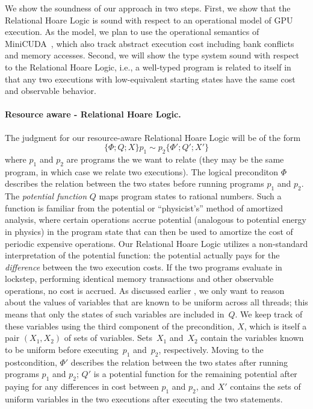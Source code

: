 We show the soundness of our approach in two steps.
%
First, we show that the Relational Hoare Logic is sound with respect to an operational model of GPU execution.
%
As the model, we plan to use the operational semantics of MiniCUDA~\cite{MullerHo21}, which also track abstract execution cost including bank conflicts and memory accesses.
%
Second, we will show the type system sound with respect to the Relational Hoare Logic, i.e., a well-typed program is related to itself in that any two executions with low-equivalent starting states have the same cost and observable behavior.



\paragraph{Resource aware - Relational Hoare Logic.}
The judgment for our resource-aware Relational Hoare Logic will be of the form 
%
\[\{\Phi; Q; X\} p_1 \sim p_2 \{\Phi'; Q'; X'\}\]
%
where $p_1$ and $p_2$ are programs the we want to relate (they may be the same program, in which case we relate two executions).%
The logical preconditon $\Phi$  describes the relation between the two states before running programs $p_1$ and $p_2$. 
%
The {\em potential function} $Q$ maps program states to rational numbers.
%
Such a function is familiar from the potential or ``physicist's'' method of amortized analysis, where certain operations accrue potential (analogous to potential energy in physics) in the program state that can then be used to amortize the cost of periodic expensive operations.
%
Our Relational Hoare Logic utilizes a non-standard interpretation of the potential function: the potential actually pays for the {\em difference} between the two execution costs.
%
If the two programs evaluate in lockstep, performing identical memory transactions and other observable operations, no cost is accrued.
%
As discussed earlier , we only want to reason about the values of variables that are known to be uniform across all threads; this means that only the states of such variables are included in~$Q$.
%
We keep track of these variables using the third component of the precondition, $X$, which is itself a pair $(X_1, X_2)$ of sets of variables.
%
Sets~$X_1$ and~$X_2$ contain the variables known to be uniform before executing~$p_1$ and~$p_2$, respectively.
%
Moving to the postcondition, $\Phi'$ describes the relation between the two states after running programs $p_1$ and $p_2$; $Q'$ is a potential function for the remaining potential after paying for any differences in cost between $p_1$ and $p_2$, and $X'$ contains the sets of uniform variables in the two executions after executing the two statements.

